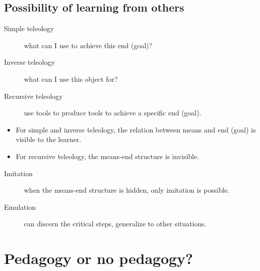 \subsection{Possibility of learning from others}

\begin{frame}
  \begin{definition}[Teleology]
    \begin{description}
      \item[Simple teleology] what can I use to achieve this end (goal)?
      \item[Inverse teleology] what can I use this object for?
      \item[Recursive teleology] use tools to produce tools to achieve a 
        specific end (goal).
    \end{description}
  \end{definition}

  \pause

  \begin{remark}
    \begin{itemize}
      \item For simple and inverse teleology, the relation between means and 
        end (goal) is visible to the learner.
      \item For recursive teleology, the means-end structure is invisible.
    \end{itemize}
  \end{remark}
\end{frame}

\begin{frame}
  \begin{definition}
    \begin{description}
      \item[Imitation] when the means-end structure is hidden, only imitation 
        is possible.
      \item[Emulation] can discern the critical steps, generalize to other 
        situations.
    \end{description}
  \end{definition}
\end{frame}


\section{Pedagogy or no pedagogy?}

